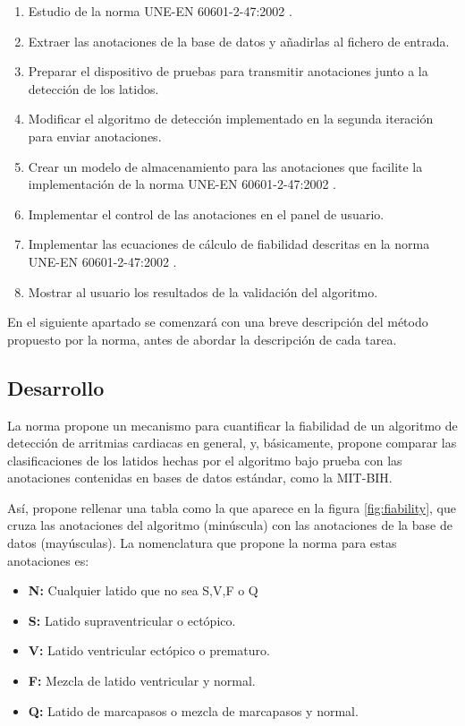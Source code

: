         \begin{enumerate}
            \item Estudio de la norma UNE-EN 60601-2-47:2002 \cite{Aenor2002}.
            \item Extraer las anotaciones de la base de datos y añadirlas al fichero de entrada.
            \item Preparar el dispositivo de pruebas para transmitir anotaciones junto a la detección de los latidos.
            \item Modificar el algoritmo de detección implementado en la segunda iteración para enviar anotaciones.
            \item Crear un modelo de almacenamiento para las anotaciones que facilite la implementación de la norma UNE-EN 60601-2-47:2002 \cite{Aenor2002}.
            \item Implementar el control de las anotaciones en el panel de usuario.
            \item Implementar las ecuaciones de cálculo de fiabilidad descritas en la norma UNE-EN 60601-2-47:2002 \cite{Aenor2002}.
            \item Mostrar al usuario los resultados de la validación del algoritmo.
        \end{enumerate}
    En el siguiente apartado se comenzará con una breve descripción del método propuesto por la norma, antes de abordar la descripción de cada tarea. 
    
    \subsection{Desarrollo}
    
 
    La norma propone un mecanismo para cuantificar la fiabilidad de un algoritmo de detección de arritmias cardiacas en general, y, básicamente, propone comparar las clasificaciones de los latidos hechas por el algoritmo bajo prueba con las anotaciones contenidas en bases de datos estándar, como la MIT-BIH. 
    
    Así, propone rellenar una tabla como la que aparece en la figura \ref{fig:fiability}, que cruza las anotaciones del algoritmo (minúscula) con las anotaciones de la base de datos (mayúsculas). La nomenclatura que propone la norma para estas anotaciones es: 
    \begin{itemize}
        \item \textbf{N:} Cualquier latido que no sea S,V,F o Q
        \item \textbf{S:} Latido supraventricular o ectópico.
        \item \textbf{V:} Latido ventricular ectópico o prematuro.
        \item \textbf{F:} Mezcla de latido ventricular y normal.
        \item \textbf{Q:} Latido de marcapasos o mezcla de marcapasos y normal.
    \end{itemize}
     
